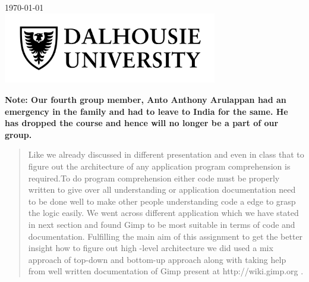 \begin{titlepage}

{\large \today}\\[2cm] %


\includegraphics[width=0.7\textwidth]{dal.jpg}%
 

\vfill %

\end{titlepage}
\newpage
\textbf{Note: Our fourth group member, Anto Anthony Arulappan had an emergency in the family and had to leave to India for the same. He has dropped the course and hence will no longer be a part of our group.}
\newpage
\tableofcontents
\newpage
\justify
\begin{abstract}
Like we already discussed in different presentation and even in class that to figure out the architecture of any application program comprehension is required.To do program comprehension either code must be properly written to give over all understanding or application documentation need to be done well to make other people understanding code a edge to grasp the logic easily. We went across different application which we have stated in next section and found Gimp to be most suitable in terms of code and documentation. Fulfilling the main aim of this assignment to get the better insight how to figure out high -level architecture we did used a mix approach of top-down and bottom-up approach along with taking help from well written documentation of Gimp present at http://wiki.gimp.org . 
\end{abstract}


